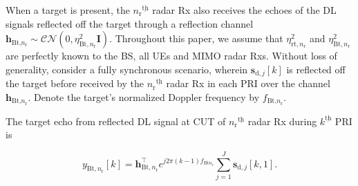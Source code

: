 \documentclass[9pt,journal]{IEEEtran}
\newcommand{\paren}[1]{\left({#1}\right)}
\newcommand{\bracket}[1]{{\left [{#1}\right ]}}
\newcommand{\ith}[1]    {{#1}^{\underline{\text{th}}}}
\newcommand{\rr}{_\mathrm{r}}
\newcommand{\target}{\mathrm{t}}
\theoremstyle{definition}
\begin{document}
When a target is present, the $\ith{n\rr}$ radar Rx also receives the echoes of the DL signals reflected off the target through a reflection channel $\mathbf{h}_{\textrm{Bt,}n\rr}\sim\mathcal{CN}\paren{0,\eta^2_{\textrm{Bt},n\rr}\mathbf{I}}$. Throughout this paper, we assume that $\eta^2_{\textrm{rt},n\rr}$ and $\eta^2_{\textrm{Bt},n\rr}$ are perfectly known to the BS, all UEs and MIMO radar Rxs. Without loss of generality, consider a fully synchronous scenario, wherein $\mathbf{s}_{\textrm{d},j}\bracket{k}$ is reflected off the target before received by %
the $\ith{n\rr}$ radar Rx in each PRI over the channel $\mathbf{h}_{\textrm{Bt,}n\rr}$.
Denote the target's normalized Doppler frequency by $f_{\textrm{Bt,}n\rr}$. 

The target echo from reflected DL signal at CUT of $\ith{n\rr}$ radar Rx during $\ith{k}$ PRI is\par\noindent\small
\begin{equation}
y_{\mathrm{Bt},n\rr}\bracket{k}=\mathbf{h}_{\mathrm{Bt},n\rr}^\top e^{j2\pi\paren{k-1} f_{\mathrm{Bt}n_\mathrm{r}}}
\sum_{j=1}^\mathit{J}\mathbf{s}_{\textrm{d},j}\bracket{k,1}.
\end{equation}\normalsize
\end{document}
